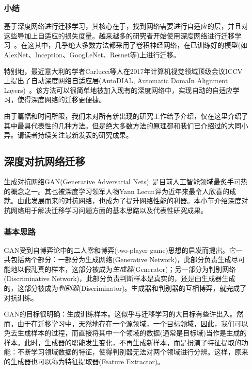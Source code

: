 \subsubsection{小结}

基于深度网络进行迁移学习，其核心在于，找到网络需要进行自适应的层，并且对这些导加上自适应的损失度量。越来越多的研究者开始使用深度网络进行迁移学习~\cite{long2016deep,zhuo2017deep,zhuang2015supervised,sun2016deep,wei2016deep,luo2017label}。在这其中，几乎绝大多数方法都采用了卷积神经网络，在已训练好的模型(如AlexNet、Inception、GoogLeNet、Resnet等)上进行迁移。

特别地，最近意大利的学者Carlucci等人在2017年计算机视觉领域顶级会议ICCV上提出了自动深度网络自适应层(AutoDIAL, Automatic DomaIn Alignment Layers)~\cite{carlucci2017autodial}。该方法可以很简单地被加入现有的深度网络中，实现自动的自适应学习，使得深度网络的迁移更便捷。

由于篇幅和时间所限，我们未对所有新出现的研究工作给予介绍，仅在这里介绍了其中最具代表性的几种方法。但是绝大多数方法的原理都和我们已介绍过的大同小异。请读者持续关注最新发表的研究成果。

\subsection{深度对抗网络迁移}

生成对抗网络GAN(Generative Adversarial Nets)~\cite{goodfellow2014generative}是目前人工智能领域最炙手可热的概念之一。其也被深度学习领军人物Yann Lecun评为近年来最令人欣喜的成就。由此发展而来的对抗网络，也成为了提升网络性能的利器。本小节介绍深度对抗网络用于解决迁移学习问题方面的基本思路以及代表性研究成果。

\subsubsection{基本思路}

GAN受到自博弈论中的二人零和博弈(two-player game)思想的启发而提出。它一共包括两个部分：一部分为生成网络(Generative Network)，此部分负责生成尽可能地以假乱真的样本，这部分被成为\textit{生成器}(Generator)；另一部分为判别网络(Discriminative Network)，此部分负责判断样本是真实的，还是由生成器生成的，这部分被成为\textit{判别器}(Discriminator)。生成器和判别器的互相博弈，就完成了对抗训练。

GAN的目标很明确：生成训练样本。这似乎与迁移学习的大目标有些许出入。然而，由于在迁移学习中，天然地存在一个源领域，一个目标领域，因此，我们可以免去生成样本的过程，而直接将其中一个领域的数据(通常是目标域)当作是生成的样本。此时，生成器的职能发生变化，不再生成新样本，而是扮演了特征提取的功能：不断学习领域数据的特征，使得判别器无法对两个领域进行分辨。这样，原来的生成器也可以称为特征提取器(Feature Extractor)。

